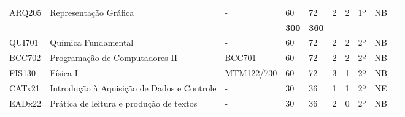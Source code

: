 \begin{table}[]
{\begin{tabular}{l|l|l|l|l|l|l|l|l|l}
			\multicolumn{1}{|l|}{ARQ205}                        & Representação Gráfica                                    & -                             & 60                                                           & 72                         & 2                        & 2                         & 1º                         & NB                      &  \\ \cline{1-9}
			\multicolumn{1}{|l|}{}                              &                                                          &                               & \textbf{300}                                                 & \textbf{360}               &                          &                           &                            &                         &  \\ \cline{1-9}
			\multicolumn{1}{|l|}{QUI701}                        & Química Fundamental                                      & -                             & 60                                                           & 72                         & 2                        & 2                         & 2º                         & NB                      &  \\ \cline{1-9}
			\multicolumn{1}{|l|}{BCC702}                        & Programação de Computadores II                           & BCC701                        & 60                                                           & 72                         & 2                        & 2                         & 2º                         & NB                      &  \\ \cline{1-9}
			\multicolumn{1}{|l|}{FIS130}                        & Física I                                                 & MTM122/730                    & 60                                                           & 72                         & 3                        & 1                         & 2º                         & NB                      &  \\ \cline{1-9}
			\multicolumn{1}{|l|}{CATx21}                        & Introdução à Aquisição de Dados e Controle               & -                             & 30                                                           & 36                         & 1                        & 1                         & 2º                         & NE                      &  \\ \cline{1-9}
			\multicolumn{1}{|l|}{EADx22}                        & Prática de leitura e produção de textos                  & -                             & 30                                                           & 36                         & 2                        & 0                         & 2º                         & NB                      &  \\ \cline{1-9}

\end{tabular}}
\end{table}
